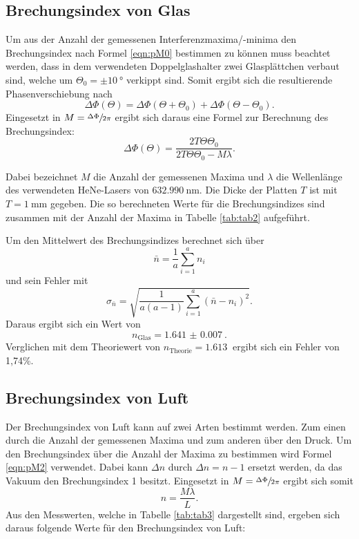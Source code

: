 \subsection{Brechungsindex von Glas}

Um aus der Anzahl der gemessenen Interferenzmaxima/-minima den Brechungsindex nach Formel \ref{eqn:pM0}
bestimmen zu können muss beachtet werden, dass in dem verwendeten Doppelglashalter zwei Glasplättchen verbaut sind,
welche um $\Theta_0=\pm\SI{10}{\degree}$ verkippt sind. Somit ergibt sich die resultierende
Phasenverschiebung nach
\begin{equation}
  \Delta\Phi(\Theta)=\Delta\Phi(\Theta+\Theta_0)+\Delta\Phi(\Theta-\Theta_0).
\end{equation}
Eingesetzt in $M=\sfrac{\Delta\Phi}{2\pi}$ ergibt sich daraus eine Formel zur Berechnung des Brechungsindex:
\begin{equation}
  \Delta\Phi(\Theta)=\frac{2T\Theta\Theta_0}{2T\Theta\Theta_0-M\lambda}.
\end{equation}

Dabei bezeichnet $M$ die Anzahl der gemessenen Maxima und $\lambda$ die Wellenlänge des
verwendeten HeNe-Lasers von $\SI{632,990}{\nm}$. Die Dicke der Platten $T$ ist mit
$T=\SI{1}{\mm}$ gegeben. Die so berechneten Werte für die Brechungsindizes sind zusammen mit
der Anzahl der Maxima in Tabelle \ref{tab:tab2} aufgeführt.



Um den Mittelwert des Brechungsindizes berechnet sich über
\begin{equation}
  \bar{n}=\frac{1}{a}\sum_{i=1}^{a}n_i
  \label{eqn:Mittel}
\end{equation}
und sein Fehler mit
\begin{equation}
  \sigma_{\bar{n}}=\sqrt{\frac{1}{a(a-1)}\sum_{i=1}^{a}(\bar{n}-n_i)^2}.
  \label{eqn:Fehler}
\end{equation}
Daraus ergibt sich ein Wert von
\begin{equation}
  n_\text{Glas}=\SI{1.641(7)}{}.
\end{equation}
Verglichen mit dem Theoriewert von $n_\text{Theorie}=\SI{1,613}{}$ ergibt sich ein Fehler von 1,74\%.

\subsection{Brechungsindex von Luft}

Der Brechungsindex von Luft kann auf zwei Arten bestimmt werden. Zum einen durch die Anzahl der
gemessenen Maxima und zum anderen über den Druck.
Um den Brechungsindex über die Anzahl der Maxima zu bestimmen wird Formel \ref{eqn:pM2}
verwendet. Dabei kann $\Delta n$ durch  $\Delta n= n-1$ ersetzt werden, da das Vakuum den
Brechungsindex 1 besitzt. Eingesetzt in $M=\sfrac{\Delta\Phi}{2\pi}$ ergibt sich somit
\begin{equation}
  n=\frac{M\lambda}{L}.
\end{equation}
Aus den Messwerten, welche in Tabelle \ref{tab:tab3} dargestellt sind, ergeben sich daraus folgende Werte für
den Brechungsindex von Luft:

